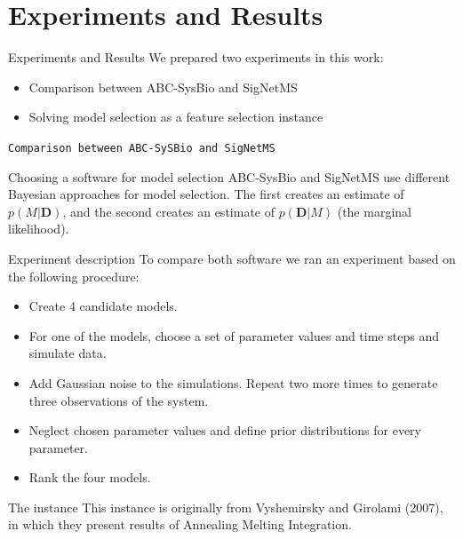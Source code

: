 \documentclass{beamer}
\begin{document}
\section{Experiments and Results}
\begin{frame}{Experiments and Results}
We prepared two experiments in this work: \pause
    \begin{itemize}
        \item{Comparison between ABC-SysBio and SigNetMS}
        \item{Solving model selection as a feature selection instance}
    \end{itemize}
\end{frame}

\begin{frame}{}
\begin{center}
    \texttt{Comparison between ABC-SySBio and SigNetMS}
\end{center}
\end{frame}

\begin{frame}{Choosing a software for model selection}
ABC-SysBio and SigNetMS use different Bayesian approaches for model
selection. \pause The first creates an estimate of $p(M|{\bm D})$, 
\pause and the second creates an estimate of $p({\bm D}|M)$ (the
marginal likelihood).
\end{frame}

\begin{frame}{Experiment description}
To compare both software we ran an experiment based on the following
procedure:
\begin{itemize}
    \pause
    \item{Create 4 candidate models.}
    \pause
    \item{For one of the models, choose a set of parameter values 
        and time steps and simulate data.}
    \pause
    \item{Add Gaussian noise to the simulations. Repeat two more 
        times to generate three observations of the system.}
    \pause
    \item{Neglect chosen parameter values and define prior distributions
        for every parameter.}
    \pause
    \item{Rank the four models.}
\end{itemize}
\end{frame}

\begin{frame}{The instance}
This instance is originally from Vyshemirsky and Girolami (2007), in 
which they present results of Annealing Melting Integration. 
\end{frame}
\end{document}
